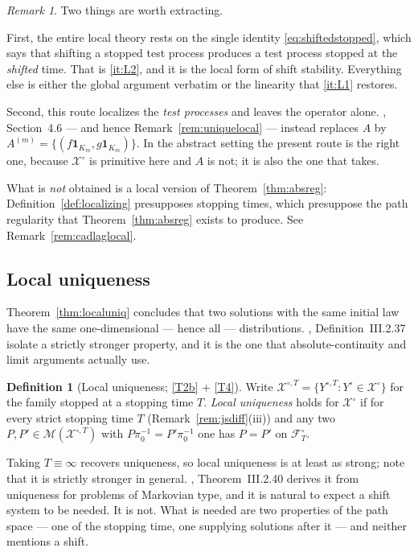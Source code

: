 \documentclass[11pt,a4paper]{article}
\theoremstyle{plain}
\theoremstyle{definition}
\newtheorem{definition}[theorem]{Definition}
\theoremstyle{remark}
\newtheorem{remark}[theorem]{Remark}
\newcommand{\Filt}{\mathcal{F}}
\newcommand{\XX}{\mathcal{X}}                  %
\newcommand{\Msol}{\mathcal{M}}
\newcommand{\one}{\mathbf{1}}
\newcommand{\EK}{\cite{EK86}}
\newcommand{\KA}{\cite{Kal21}}
\newcommand{\JS}{\cite{JS03}}
\begin{document}
\begin{remark}
  \label{rem:localsummary}
  Two things are worth extracting.

  First, the entire local theory rests on the single identity
  \eqref{eq:shiftedstopped}, which says that shifting a stopped test process
  produces a test process stopped at the \emph{shifted} time.  That is
  \ref{it:L2}, and it is the local form of shift stability.  Everything else is
  either the global argument verbatim or the linearity that \ref{it:L1} restores.

  Second, this route localizes the \emph{test processes} and leaves the operator
  alone.  \EK, Section~4.6 --- and hence Remark~\ref{rem:uniquelocal} --- instead
  replaces $A$ by $A^{(m)} = \{(f\one_{K_m}, g\one_{K_m})\}$.  In the abstract
  setting the present route is the right one, because $\XX^\circ$ is primitive
  here and $A$ is not; it is also the one that \KA{} takes.

  What is \emph{not} obtained is a local version of Theorem~\ref{thm:absreg}:
  Definition~\ref{def:localizing} presupposes stopping times, which presuppose
  the path regularity that Theorem~\ref{thm:absreg} exists to produce.  See
  Remark~\ref{rem:cadlaglocal}.
\end{remark}

\subsection{Local uniqueness}
\label{ssec:localuniq}

Theorem~\ref{thm:localuniq} concludes that two solutions with the same initial law
have the same one-dimensional --- hence all --- distributions.  \JS,
Definition~III.2.37 isolate a strictly stronger property, and it is the one that
absolute-continuity and limit arguments actually use.

\begin{definition}[Local uniqueness; \eqref{T2b} + \eqref{T4}]
  \label{def:localuniq}
  Write $\XX^{\circ,T} = \{ Y^{\circ,T} : Y^\circ \in \XX^\circ \}$ for the family
  stopped at a stopping time $T$.  \emph{Local uniqueness} holds for $\XX^\circ$
  if for every strict stopping time $T$ (Remark~\ref{rem:jsdiff}(iii)) and any two
  $P, P' \in \Msol(\XX^{\circ,T})$ with $P\pi_0^{-1} = P'\pi_0^{-1}$ one has
  $P = P'$ on $\Filt^\circ_T$.
\end{definition}

Taking $T \equiv \infty$ recovers uniqueness, so local uniqueness is at least as
strong; \JS{} note that it is strictly stronger in general.  \JS, Theorem~III.2.40
derives it from uniqueness for problems of Markovian type, and it is natural to
expect a shift system to be needed.  It is not.  What is needed are two
properties of the path space --- one of the stopping time, one supplying
solutions after it --- and neither mentions a shift.
\end{document}
